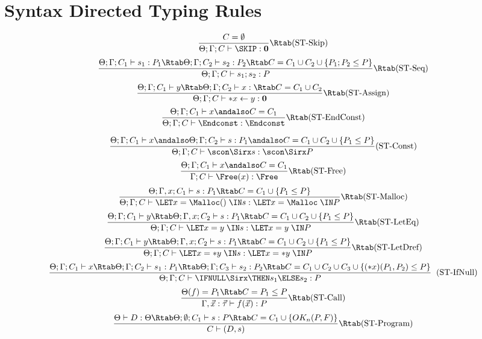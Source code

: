 \section{Syntax Directed Typing Rules}

\begin{minipage}{\textwidth}

$$
     \frac{ C = \emptyset}
           {\Theta; \Gamma; C \vdash \SKIP : \mathbf{0}}
      \Rtab \mbox{(ST-Skip)}
$$
$$
      \frac{\Theta;\Gamma ; C_{1} \vdash s_{1} : P_{1} \Rtab \Theta; \Gamma ; C_{2} \vdash s_{2} : P_{2} \Rtab C = C_{1}\cup C_{2} \cup \{ P_{1};P_{2} \le P\}}
      {\Theta;\Gamma; C \vdash s_{1};s_{2} : P}
      \Rtab \mbox{(ST-Seq)}
$$
$$
      \frac{\Theta;\Gamma;C_{1} \vdash y \Rtab \Theta;\Gamma; C_{2} \vdash x : \Rtab C = C_{1}\cup C_{2}}
      {\Theta;\Gamma; C \vdash *x \leftarrow y : \mathbf{0}}
      \Rtab \mbox{(ST-Assign)}
$$
$$
\frac {\Theta;\Gamma;C_1 \vdash x \andalso C = C_1}
      { \Theta; \Gamma; C \vdash \Endconst:\Endconst }
      \Rtab \mbox{(ST-EndConst)}
      $$

$$
 \frac{ \Theta; \Gamma; C_1 \vdash x \andalso
     \Theta; \Gamma; C_2 \vdash s:P_1 \andalso C =
    C_1 \cup C_2 \cup \{ P_1 \le P \} }
  {\Theta; \Gamma; C \vdash
   \scon\Sirx s : \scon\Sirx P}
 \mbox{(ST-Const)}
$$
$$
      \frac
      {\Theta;\Gamma; C_1 \vdash x \andalso C = C_1}
      {\Gamma ; C \vdash \Free (x) : \Free}
     \Rtab \mbox{(ST-Free)}
$$
$$
     \frac{\Theta;\Gamma, x ; C_{1} \vdash s : P_{1} \Rtab C = C_{1} \cup\{P_{1}\le P\}}
     {\Theta;\Gamma; C \vdash \LET x = \Malloc() \; \IN s : \LET x = \Malloc \; \IN P}
     \Rtab \mbox{(ST-Malloc)}
$$
$$
     \frac{\Theta;\Gamma; C_{1} \vdash y \Rtab \Theta;\Gamma, x ; C_{2} \vdash s : P_{1} \Rtab C = C_{1}\cup C_{2} \cup \{P_{1} \le P \}}
     {\Theta;\Gamma ; C \vdash \LET x = y \;  \IN s : \LET x = y \; \IN  P}
     \Rtab \mbox{(ST-LetEq)}
$$
$$
     \frac{\Theta;\Gamma ; C_{1} \vdash y \Rtab \Theta;\Gamma, x ; C_{2} \vdash s : P_{1} \Rtab C = C_{1}\cup C_{2}\cup\{P_{1} \le P\}}
     {\Theta;\Gamma ; C \vdash \LET x = *y \; \IN s : \LET x = *y \; \IN P}
     \Rtab \mbox{(ST-LetDref)}
$$
$$
     \frac{\Theta;\Gamma; C_{1} \vdash x \Rtab \Theta;\Gamma; C_{2} \vdash s_{1} : P_1 \Rtab \Theta;\Gamma; C_{3} \vdash s_{2} : P_2  \Rtab  C = C_{1} \cup C_{2} \cup C_{3} \cup  \{ (*x)(P_1,P_2) \le P \}}
     {\Theta;\Gamma; C \vdash \IFNULL\Sirx \THEN s_{1} \ELSE s_{2} : P }
    \; \;  \mbox{(ST-IfNull)}
$$
$$
     \frac{\Theta(f) = P_{1} \Rtab C = P_{1} \le P}
     {\Gamma,\vec{x}:\vec{\tau} \vdash f(\vec{x}) : P }
     \Rtab \mbox{(ST-Call)}
$$
$$
     \frac{\Theta \vdash D : \Theta \Rtab \Theta ; \emptyset ; C_{1} \vdash s : P \Rtab C = C_{1}\cup\{OK_{n}(P, F)\}}
     {C \vdash (D , s) }
     \Rtab \mbox{(ST-Program)}
$$


\end{minipage}

